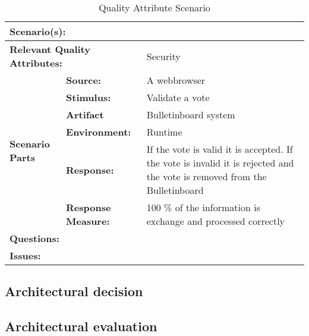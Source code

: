 \begin{table}[H]
\begin{center}
\begin{tabular}{|p{0.3cm}|p{2.5cm}|p{8cm}|}
  \hline
  \multicolumn{2}{|p{3cm}|}{\bfseries Scenario(s):} & \\
  \hline
  \multicolumn{2}{|p{3cm}|}{\bfseries Relevant Quality Attributes:} & Security\\
  \hline
  \multirow{6}{*}{\begin{sideways}{\bfseries Scenario Parts}\end{sideways}}
  & {\bfseries Source:} & A webbrowser \\
  \cline{2-3}
  & {\bfseries Stimulus:} & Validate a vote \\
  \cline{2-3}
  & {\bfseries Artifact} &  Bulletinboard system \\
  \cline{2-3}
  & {\bfseries Environment:} &  Runtime \\
  \cline{2-3}
  & {\bfseries Response:} &  If the vote is valid it is accepted. If the vote is invalid it is rejected and the vote is removed from the Bulletinboard \\
  \cline{2-3}
  & {\bfseries Response Measure:} & 100 \% of the information is exchange and processed correctly \\
  \hline
  \multicolumn{2}{|p{3cm}|}{\bfseries Questions:} &  \\
  \hline
  \multicolumn{2}{|p{3cm}|}{\bfseries Issues:} &  \\
  \hline
\end{tabular}
\caption{Quality Attribute Scenario}
\end{center}
\end{table}



\subsection{Architectural decision}


\subsection{Architectural evaluation}
